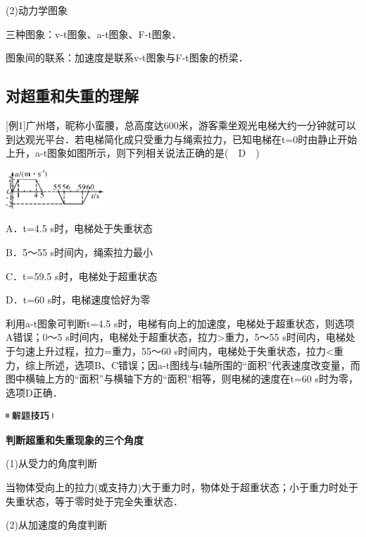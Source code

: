 (2)动力学图象

三种图象：v-t图象、a-t图象、F-t图象．

图象间的联系：加速度是联系v-t图象与F-t图象的桥梁．

\newpage
\subsection{对超重和失重的理解}

{[}例1{]}广州塔，昵称小蛮腰，总高度达600米，游客乘坐观光电梯大约一分钟就可以到达观光平台．若电梯简化成只受重力与绳索拉力，已知电梯在t=0时由静止开始上升，a-t图象如图所示，则下列相关说法正确的是(　D　)

\begin{center}\includegraphics[width=1.44792in,height=0.57292in]{media/image116.png}\end{center}

A．t=4.5 s时，电梯处于失重状态

B．5～55 s时间内，绳索拉力最小

C．t=59.5 s时，电梯处于超重状态

D．t=60 s时，电梯速度恰好为零
\begin{solution}
	利用a-t图象可判断t=4.5
s时，电梯有向上的加速度，电梯处于超重状态，则选项A错误；0～5
s时间内，电梯处于超重状态，拉力\textgreater 重力，5～55
s时间内，电梯处于匀速上升过程，拉力=重力，55～60
s时间内，电梯处于失重状态，拉力\textless 重力，综上所述，选项B、C错误；因a-t图线与t轴所围的``面积''代表速度改变量，而图中横轴上方的``面积''与横轴下方的``面积''相等，则电梯的速度在t=60
s时为零，选项D正确．
\end{solution}

\begin{center}\includegraphics[width=0.70833in,height=0.125in]{media/image37.png}

\textbf{判断超重和失重现象的三个角度}
\end{center}


(1)从受力的角度判断

当物体受向上的拉力(或支持力)大于重力时，物体处于超重状态；小于重力时处于失重状态，等于零时处于完全失重状态．

(2)从加速度的角度判断

